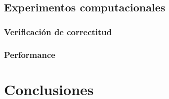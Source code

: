 \documentclass[a4paper, 10pt, twoside]{article}
\begin{document}
\subsection{Experimentos computacionales}
\subsubsection{Verificación de correctitud}

\subsubsection{Performance}





\newpage

\section{Conclusiones}






\newpage
\end{document}
